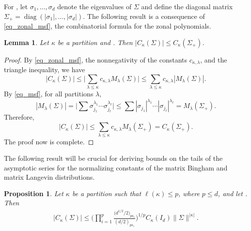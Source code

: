 \documentclass[pdftex]{sigma}
\numberwithin{equation}{section}
\newtheorem{Lemma}[Theorem]{Lemma}
\newtheorem{Proposition}[Theorem]{Proposition}
 { \theoremstyle{definition}
\newtheorem{Definition}[Theorem]{Definition}
\newtheorem{Note}[Theorem]{Note}
\newtheorem{Example}[Theorem]{Example}
\newtheorem{Remark}[Theorem]{Remark} }
\def\R {\mathbb{R}}
\def\diag{\mathop{\mathrm{diag}}}
\newcommand{\sym}{{{\hskip-1pt}\mathop{\mathrm{sym}}}}
\begin{document}
For \smash{$\Sigma \in \R^{d \times d}_\sym$}, let $\sigma_1,\ldots,\sigma_d$ denote the eigenvalues of $\Sigma$ and define the diagonal matrix $\Sigma_+ = \diag(|\sigma_1|,\ldots,|\sigma_d|)$. The following result is a consequence of \eqref{eq_zonal_msf}, the combinatorial formula for the zonal polynomials.

\begin{Lemma}
\label{lem_zonal_psd}
Let $\kappa$ be a partition and \smash{$\Sigma \in \R^{d \times d}_\sym$}. Then $|C_\kappa(\Sigma)| \le C_\kappa(\Sigma_+)$.
\end{Lemma}

\begin{proof}
By \eqref{eq_zonal_msf}, the nonnegativity of the constants $c_{\kappa,\lambda}$, and the triangle inequality, we have
\[
|C_\kappa(\Sigma)| \le \boldsymbol{\bigg|}\sum_{\lambda \le \kappa} c_{\kappa,\lambda} M_\lambda(\Sigma)\boldsymbol{\bigg|}
\le \sum_{\lambda \le \kappa} c_{\kappa,\lambda} |M_\lambda(\Sigma)|.
\]
By \eqref{eq_msf}, for all partitions $\lambda$,
\[
|M_\lambda(\Sigma)| = \boldsymbol{\Big|}\sum \sigma_{j_1}^{\lambda_1} \cdots \sigma_{j_\ell}^{\lambda_\ell}\boldsymbol{\Big|}
\le \sum |\sigma_{j_1}|^{\lambda_1} \cdots |\sigma_{j_\ell}|^{\lambda_\ell}
= M_\lambda(\Sigma_+).
\]
Therefore, \[
|C_\kappa(\Sigma)| \le \sum_{\lambda \le \kappa} c_{\kappa,\lambda} M_\lambda(\Sigma_+) =
C_\kappa(\Sigma_+).
\]
The proof now is complete.
\end{proof}



The following result will be crucial for deriving bounds on the tails of the asymptotic series for the normalizing constants of the matrix Bingham and matrix Langevin distributions.

\begin{Proposition}
\label{prop_zonal_bound}
Let $\kappa$ be a partition such that $\ell(\kappa) \le p$, where $p \le d$, and let \smash{$\Sigma \in \R^{d \times d}_\sym$}. Then
\begin{gather}
\label{eq_zonal_bound}
|C_\kappa(\Sigma)| \le \Bigg(\prod_{i=1}^p \frac{\bigl(d^{1/2}/2\bigr)_{p \kappa_i}}{(d/2)_{p \kappa_i}}\Bigg)^{1/p} C_\kappa(I_d) \|\Sigma\|^{|\kappa|}.
\end{gather}
\end{Proposition}
\end{document}
